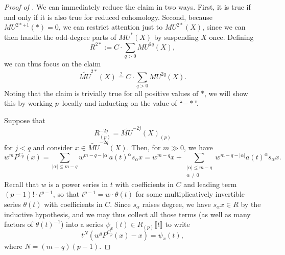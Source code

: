\begin{proof}[{Proof of }]
We can immediately reduce the claim in two ways.  First, it is true if and only if it is also true for reduced cohomology.  Second, because $MU^{2*+1}(*) = 0$, we can restrict attention just to $MU^{2*}(X)$, since we can then handle the odd-degree parts of $MU^*(X)$ by suspending $X$ once.  Defining \[R^{2*} := C \cdot \sum_{q > 0} MU^{2q}(X),\] we can thus focus on the claim \[\widetilde{MU}^{2*}(X) \stackrel{?}{=} C \cdot \sum_{q > 0} MU^{2q}(X).\]  Noting that the claim is trivially true for all positive values of $*$, we will show this by working $p$--locally and inducting on the value of ``$-*$''.

Suppose that \[R^{-2j}_{(p)} = \widetilde{MU}^{-2j}(X)_{(p)}\] for $j < q$ and consider $x \in \widetilde{MU}^{-2q}(X)$.  Then, for $m \gg 0$, we have \[w^m P^{C_p}(x) = \sum_{|\alpha| \le m-q} w^{m-q - |\alpha|} a(t)^\alpha s_\alpha x = w^{m-q} x + \sum_{\substack{|\alpha| \le m-q \\ \alpha \ne 0}} w^{m-q - |\alpha|} a(t)^\alpha s_\alpha x.\]  Recall that $w$ is a power series in $t$ with coefficients in $C$ and leading term $(p-1)! \cdot t^{p-1}$, so that $t^{p-1} = w \cdot \theta(t)$ for some multiplicatively invertible series $\theta(t)$ with coefficients in $C$.  Since $s_\alpha$ raises degree, we have $s_\alpha x \in R$ by the inductive hypothesis, and we may thus collect all those terms (as well as many factors of $\theta(t)^{-1}$) into a series $\psi_x(t) \in R_{(p)}\llbracket t \rrbracket$ to write \[t^N(w^q P^{C_p}(x) - x) = \psi_x(t),\] where $N = (m-q)(p-1)$.


\end{proof}
